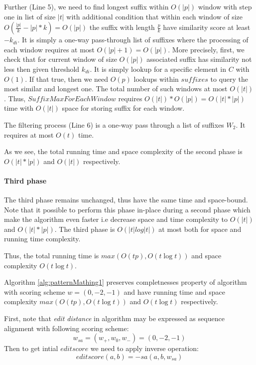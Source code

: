 Further (Line 5), we need to find longest suffix within $O(|p|)$ window with step one in list of size $|t|$ with additional condition that within each window of size $O(\frac{|p|}{k}-|p|*k)=O(|p|)$ the suffix with length $\frac{p}{k}$ have similarity score at least $-k_{di}$.
It is simply a one-way pass-through list of suffixes where the processing of each window requires at most $O(|p|+1)=O(|p|)$.
More precisely, first, we check that for current window of size $O(|p|)$
associated suffix has similarity not less then given threshold $k_{di}$.
It is simply lookup for a specific element in $C$ with $O(1)$.
If that true, then we need $O(p)$ lookups within $suffixes$ to query the most similar and longest one.    
The total number of such windows at most $O(|t|)$.
Thus, $SuffixMaxForEachWindow$ requires $O(|t|)*O(|p|)=O(|t|*|p|)$ time with $O(|t|)$ space for storing suffix for each window. 

The filtering process (Line 6) is a one-way pass through a list of suffixes $W_2$.
It requires at most $O(t)$ time.

As we see, the total running time and space complexity of the second phase is $O(|t|*|p|)$ and $O(|t|)$ respectively.

\paragraph{Third phase}
The third phase remains unchanged, thus have the same time and space-bound.
Note that it possible to perform this phase in-place during a second phase which 
make the algorithm even faster i.e decrease space and time complexity to $O(|t|)$  and $O(|t|*|p|)$.
The third phase is $O(|t| log|t|)$  at most both for space and running time complexity.

Thus, the total running time is $max(O(tp),O(t \log t))$ and space complexity $O(t \log t)$. 


\begin{theorem}
Algorithm \ref{alg:patternMathing1} preserves completnesses property of algorithm \cite{luciv2019interactive} with scoring scheme  $w = (0,-2,-1)$ and have running time and space complexity $max(O(tp),O(t \log t))$ and $O(t \log t)$  respectively.
\end{theorem}

First, note  that \emph{edit distance} in algorithm \cite{.} may be expressed as sequence alignment  with following scoring scheme: 
\begin{displaymath}
w_{sa}=(w_{+},w_{0},w_{-}) = (0,-2,-1)
\end{displaymath}
Then to get intial $edit score$ we need to apply inverse operation:
\begin{equation}\label{editsa}
editscore(a,b) = -sa(a,b,w_{sa}) 
\end{equation}

